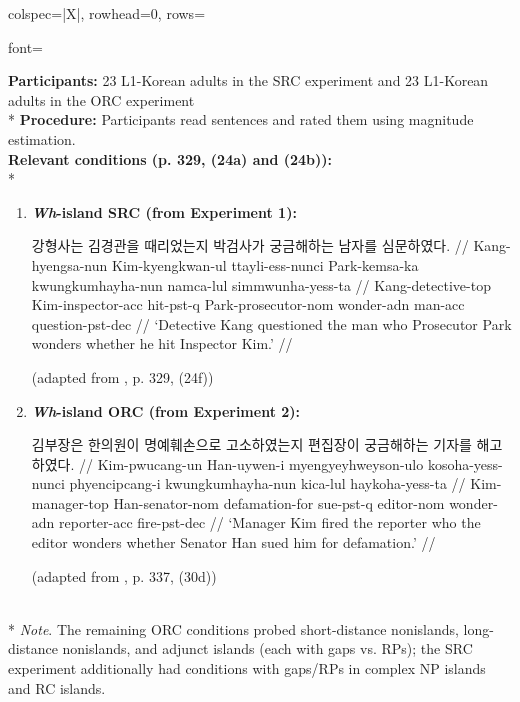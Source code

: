 \begin{longtblr}[caption={\textcite{han2013}: Acceptability judgment tasks (Experiments 1 and 2)}, label={tblr:gap-wi-h13}]{colspec={|X|}, rowhead=0, rows={font=\raggedright{}}}\hline
\textbf{Participants:} 23 L1-Korean adults in the SRC experiment and 23 L1-Korean adults in the ORC experiment \vspace{5pt}\\*
\textbf{Procedure:} Participants read sentences and rated them using magnitude estimation. \vspace{5pt}\\
\textbf{Relevant conditions (p. 329, (24a) and (24b)):} \vspace{5pt}\\*
\begin{varwidth}{\linewidth}\begin{enumerate}[\bfseries (a),itemsep=5pt] 
\item \textbf{\textit{Wh}-island SRC (from Experiment 1):}\par\nobreak\vspace{3pt}
\begingl[everygla = \ko]
\gla 강형사는 김경관을 때리었는지 박검사가 궁금해하는 남자를 심문하였다. //
\glb Kang-hyengsa-nun Kim-kyengkwan-ul ttayli-ess-nunci Park-kemsa-ka kwungkumhayha-nun namca-lul simmwunha-yess-ta //
\glc Kang-detective-{\sc top} Kim-inspector-{\sc acc}  hit-{\sc pst-q} Park-prosecutor-{\sc nom} wonder-{\sc adn} man-{\sc acc} question-{\sc pst-dec} //
\glft *`Detective Kang questioned the man who Prosecutor Park wonders whether he hit Inspector Kim.' //
\endgl
\par\nobreak\vspace{5pt}
\hfill (adapted from \cite{han2013}, p. 329, (24f))
\item \textbf{\textit{Wh}-island ORC (from Experiment 2):}\par\nobreak\vspace{3pt}
\begingl[everygla = \ko]
\gla 김부장은 한의원이 명예훼손으로 고소하였는지 편집장이 궁금해하는 기자를 해고하였다. //
\glb Kim-pwucang-un Han-uywen-i myengyeyhweyson-ulo kosoha-yess-nunci phyencipcang-i kwungkumhayha-nun kica-lul haykoha-yess-ta //
\glc Kim-manager-{\sc top} Han-senator-{\sc nom}  defamation-{\sc for} sue-{\sc pst-q} editor-{\sc nom} wonder-{\sc adn} reporter-{\sc acc} fire-{\sc pst-dec} //
\glft *`Manager Kim fired the reporter who the editor wonders whether Senator Han sued him for defamation.' //
\endgl
\par\nobreak\vspace{5pt}
\hfill (adapted from \cite{han2013}, p. 337, (30d))
\end{enumerate}\end{varwidth}\vspace{5pt}\\*
\textit{Note}. The remaining ORC conditions probed short-distance nonislands, long-distance nonislands, and adjunct islands (each with gaps vs. RPs); the SRC experiment additionally had conditions with gaps/RPs in complex NP islands and RC islands. \\\hline
\end{longtblr}

